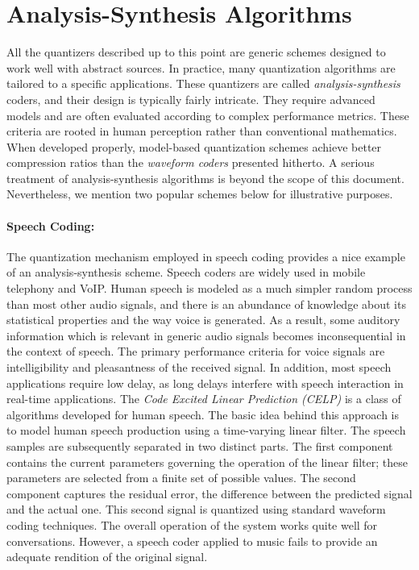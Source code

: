 \section{Analysis-Synthesis Algorithms}

All the quantizers described up to this point are generic schemes designed to work well with abstract sources.
In practice, many quantization algorithms are tailored to a specific applications.
These quantizers are called \emph{analysis-synthesis} coders, and their design is typically fairly intricate.
They require advanced models and are often evaluated according to complex performance metrics.
These criteria are rooted in human perception rather than conventional mathematics.
When developed properly, model-based quantization schemes achieve better compression ratios than the \emph{waveform coders} presented hitherto.
A serious treatment of analysis-synthesis algorithms is beyond the scope of this document.
Nevertheless, we mention two popular schemes below for illustrative purposes.

\paragraph{Speech Coding:}
The quantization mechanism employed in speech coding provides a nice example of an analysis-synthesis scheme.
Speech coders are widely used in mobile telephony and VoIP.
Human speech is modeled as a much simpler random process than most other audio signals, and there is an abundance of knowledge about its statistical properties and the way voice is generated.
As a result, some auditory information which is relevant in generic audio signals becomes inconsequential in the context of speech.
The primary performance criteria for voice signals are intelligibility and pleasantness of the received signal.
In addition, most speech applications require low delay, as long delays interfere with speech interaction in real-time applications.
The \emph{Code Excited Linear Prediction (CELP)} is a class of algorithms developed for human speech.
The basic idea behind this approach is to model human speech production using a time-varying linear filter.
The speech samples are subsequently separated in two distinct parts.
The first component contains the current parameters governing the operation of the linear filter; these parameters are selected from a finite set of possible values.
The second component captures the residual error, the difference between the predicted signal and the actual one.
This second signal is quantized using standard waveform coding techniques.
The overall operation of the system works quite well for conversations.
However, a speech coder applied to music fails to provide an adequate rendition of the original signal.

